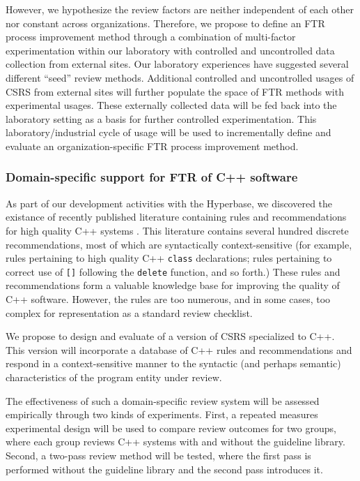 However, we hypothesize the review factors are neither independent of each
other nor constant across organizations.  Therefore, we propose to define
an FTR process improvement method through a combination of multi-factor
experimentation within our laboratory with controlled and uncontrolled data
collection from external sites.  Our laboratory experiences have suggested
several different ``seed'' review methods.  Additional controlled and
uncontrolled usages of CSRS from external sites will further populate the
space of FTR methods with experimental usages.  These externally collected
data will be fed back into the laboratory setting as a basis for further
controlled experimentation.  This laboratory/industrial cycle of usage will
be used to incrementally define and evaluate an organization-specific FTR
process improvement method.


\subsubsection{Domain-specific support for FTR of C++ software} 

As part of our development activities with the Hyperbase, we discovered the
existance of recently published literature containing rules and
recommendations for high quality C++ systems
\cite{Murray93,Ellemtel92,Meyers92,Cargill92,Coplien92}.  This literature
contains several hundred discrete recommendations, most of which are
syntactically context-sensitive (for example, rules pertaining to high
quality C++ {\tt class} declarations; rules pertaining to correct use of
{\tt []} following the {\tt delete} function, and so forth.)
These rules and recommendations form a valuable knowledge base for
improving the quality of C++ software.  However, the rules are too
numerous, and in some cases, too complex for representation as a standard
review checklist.

We propose to design and evaluate of a version of CSRS specialized to C++.
This version will incorporate a database of C++ rules and recommendations
and respond in a context-sensitive manner to the syntactic (and perhaps
semantic) characteristics of the program entity under review.

The effectiveness of such a domain-specific review system will be assessed
empirically through two kinds of experiments.  First, a repeated measures
experimental design will be used to compare review outcomes for two groups,
where each group reviews C++ systems with and without the guideline
library.  Second, a two-pass review method will be tested, where the first
pass is performed without the guideline library and the second pass
introduces it.  

